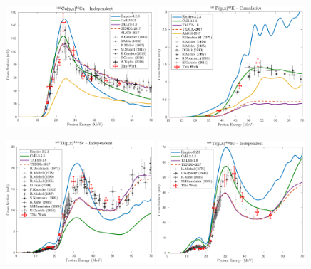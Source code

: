 \begin{figure}
 \centering
 \includegraphics[width=0.49\textwidth]{./figures/64Cu.pdf}
 \includegraphics[width=0.49\textwidth]{./figures/43K.pdf}
 
 
 \includegraphics[width=0.49\textwidth]{./figures/44mSc.pdf}
 \includegraphics[width=0.49\textwidth]{./figures/44gSc.pdf}
 

\end{figure}
